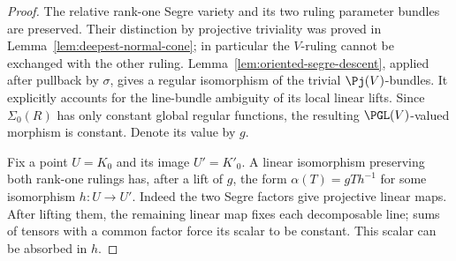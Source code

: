 \begin{proof}
The relative rank-one Segre variety and its two ruling parameter
bundles are preserved.  Their distinction by projective triviality
was proved in Lemma~\ref{lem:deepest-normal-cone}; in particular the
\(V\)-ruling cannot be exchanged with the other ruling.  Lemma~\ref{lem:oriented-segre-descent}, applied after
pullback by \(\sigma\), gives a regular isomorphism of the
trivial \(\Pj(V)\)-bundles.  It explicitly accounts for the
line-bundle ambiguity of its local linear lifts.  Since
\(\Sigma_0(R)\) has only constant global regular functions,
the resulting \(\PGL(V)\)-valued morphism is constant.
Denote its value by \(g\).

Fix a point \(U=K_0\) and its image \(U'=K'_0\).  A linear
isomorphism preserving both rank-one rulings has, after a lift of
\(g\), the form
\(\alpha(T)=gTh^{-1}\) for some isomorphism \(h:U\to U'\).
Indeed the two Segre factors give projective linear maps.  After
lifting them, the remaining linear map fixes each decomposable line;
sums of tensors with a common factor force its scalar to be constant.
This scalar can be absorbed in \(h\).


\end{proof}
